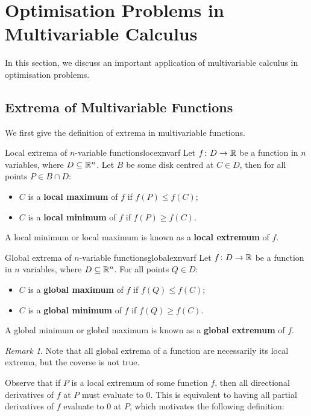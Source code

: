\documentclass[math]{amznotes}
\theoremstyle{remark}
\newtheorem*{remark}{Remark}
\begin{document}
\section{Optimisation Problems in Multivariable Calculus}
In this section, we discuss an important application of multivariable calculus in optimisation problems.
\subsection{Extrema of Multivariable Functions}
We first give the definition of extrema in multivariable functions.
\begin{dfnbox}{Local extrema of $n$-variable functions}{locexnvarf}
    Let $f \colon D \to \mathbb{R}$ be a function in $n$ variables, where $D \subseteq \mathbb{R}^n$. Let $B$ be some disk centred at $C \in D$, then for all points $P \in B \cap D$:
    \begin{itemize}
        \item $C$ is a {\color{red} \textbf{local maximum}} of $f$ if $f(P) \leq f(C)$;
        \item $C$ is a {\color{red} \textbf{local minimum}} of $f$ if $f(P) \geq f(C)$.
    \end{itemize} 
    A local minimum or local maximum is known as a {\color{red} \textbf{local extremum}} of $f$.
\end{dfnbox}
\begin{dfnbox}{Global extrema of $n$-variable functions}{globalexnvarf}
    Let $f \colon D \to \mathbb{R}$ be a function in $n$ variables, where $D \subseteq \mathbb{R}^n$. For all points $Q \in D$:
    \begin{itemize}
        \item $C$ is a {\color{red} \textbf{global maximum}} of $f$ if $f(Q) \leq f(C)$;
        \item $C$ is a {\color{red} \textbf{global minimum}} of $f$ if $f(Q) \geq f(C)$.
    \end{itemize} 
    A global minimum or global maximum is known as a {\color{red} \textbf{global extremum}} of $f$.
\end{dfnbox}
\begin{notebox}
    \begin{remark}
        Note that all global extrema of a function are necessarily its local extrema, but the coverse is not true.
    \end{remark}
\end{notebox}
Observe that if $P$ is a local extremum of some function $f$, then all directional derivatives of $f$ at $P$ must evaluate to $0$. This is equivalent to having all partial derivatives of $f$ evaluate to $0$ at $P$, which motivates the following definition:
\end{document}
